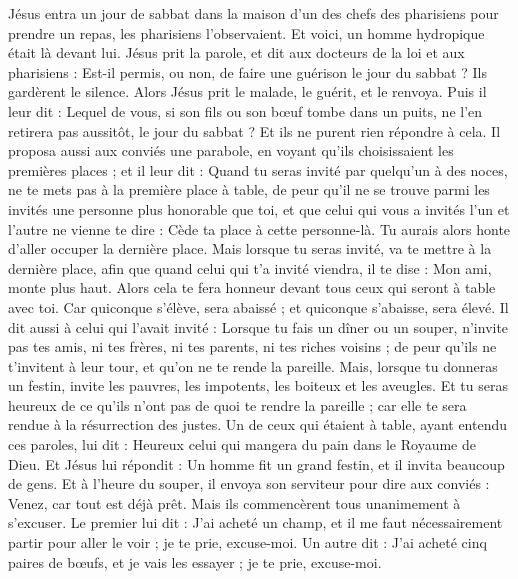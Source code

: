 \begin{multicols}{2}
\VerseOne{}Jésus entra un jour de sabbat dans la maison d'un des chefs des pharisiens pour prendre un repas, les pharisiens l'observaient.
Et voici, un homme hydropique était là devant lui.
Jésus prit la parole, et dit aux docteurs de la loi et aux pharisiens : Est-il permis, ou non, de faire une guérison le jour du sabbat ?
Ils gardèrent le silence. Alors Jésus prit le malade, le guérit, et le renvoya.
Puis il leur dit : Lequel de vous, si son fils ou son bœuf tombe dans un puits, ne l’en retirera pas aussitôt, le jour du sabbat ?
Et ils ne purent rien répondre à cela.
Il proposa aussi aux conviés une parabole, en voyant qu’ils choisissaient les premières places ; et il leur dit :
Quand tu seras invité par quelqu'un à des noces, ne te mets pas à la première place à table, de peur qu'il ne se trouve parmi les invités une personne plus honorable que toi,
et que celui qui vous a invités l’un et l’autre ne vienne te dire : Cède ta place à cette personne-là. Tu aurais alors honte d’aller occuper la dernière place.
Mais lorsque tu seras invité, va te mettre à la dernière place, afin que quand celui qui t'a invité viendra, il te dise : Mon ami, monte plus haut. Alors cela te fera honneur devant tous ceux qui seront à table avec toi.
Car quiconque s'élève, sera abaissé ; et quiconque s'abaisse, sera élevé.
Il dit aussi à celui qui l'avait invité : Lorsque tu fais un dîner ou un souper, n'invite pas tes amis, ni tes frères, ni tes parents, ni tes riches voisins ; de peur qu'ils ne t’invitent à leur tour, et qu’on ne te rende la pareille.
Mais, lorsque tu donneras un festin, invite les pauvres, les impotents, les boiteux et les aveugles.
Et tu seras heureux de ce qu'ils n'ont pas de quoi te rendre la pareille ; car elle te sera rendue à la résurrection des justes.
\TextTitle{[grandeur]}
Un de ceux qui étaient à table, ayant entendu ces paroles, lui dit : Heureux celui qui mangera du pain dans le Royaume de Dieu.
Et Jésus lui répondit : Un homme fit un grand festin, et il invita beaucoup de gens.
Et à l'heure du souper, il envoya son serviteur pour dire aux conviés : Venez, car tout est déjà prêt.
Mais ils commencèrent tous unanimement à s'excuser. Le premier lui dit : J’ai acheté un champ, et il me faut nécessairement partir pour aller le voir ; je te prie, excuse-moi.
Un autre dit : J’ai acheté cinq paires de bœufs, et je vais les essayer ; je te prie, excuse-moi.

\end{multicols}
